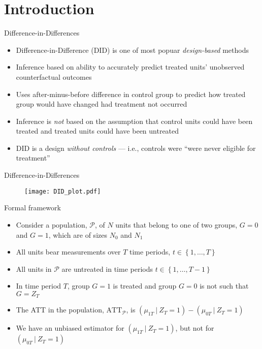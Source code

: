 \documentclass[table, xcolor={dvipsnames}, 9pt]{beamer}
\newcommand\given[1][]{\:#1\vert\:}
\theoremstyle{newstyle}
\begin{document}
\section{Introduction}
\begin{frame}{Difference-in-Differences}
\begin{itemize}
\item Difference-in-Difference (DID) is one of most popuar \textit{design-based} methods
\item \pause Inference based on ability to accurately predict treated units' unobserved counterfactual outcomes
\item \pause Uses after-minus-before difference in control group to predict how treated group would have changed had treatment not occurred  
\item \pause Inference is \textit{not} based on the assumption that control units could have been treated and treated units could have been untreated
\item \pause DID is a design \textit{without controls} --- i.e., controls were ``were never eligible for treatment'' \citep[][155]{rosenbaum2017}
\end{itemize}
\end{frame}
\begin{frame}{Difference-in-Differences}
\begin{figure}[H]
\texttt{[image: DID\_plot.pdf]}
\end{figure}
\end{frame}
\begin{frame}{Formal framework}
\begin{itemize}
\item Consider a population, $\mathcal{P}$, of $N$ units that belong to one of two groups, $G = 0$ and $G = 1$, which are of sizes $N_0$ and $N_1$
\item \pause All units bear measurements over $T$ time periods, $t \in \left\{1, \dots , T\right\}$
\item \pause All units in $\mathcal{P}$ are untreated in time periods $t \in \left\{1, \dots , T-1\right\}$
\item \pause In time period $T$, group $G = 1$ is treated and group $G = 0$ is not such that $G = Z_T$ 
\item \pause The ATT in the population, $\text{ATT}_{\mathcal{P}}$, is $\left(\mu_{1T} \given Z_T = 1\right) - \left(\mu_{0T} \given Z_T = 1\right)$
\item \pause We have an unbiased estimator for $\left(\mu_{1T} \given Z_T = 1\right)$, but not for $\left(\mu_{0T} \given Z_T = 1\right)$
\end{itemize}	
\end{frame}
\end{document}
